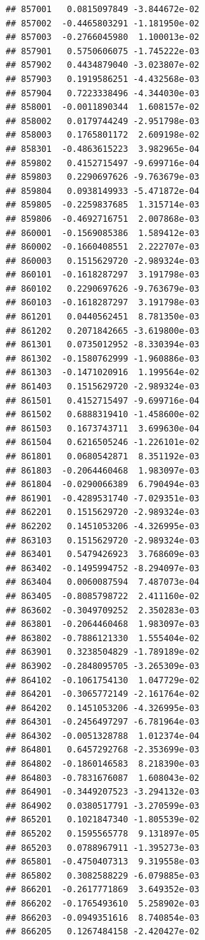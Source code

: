 \begin{frame}[fragile]
\begin{verbatim}
## 857001   0.0815097849 -3.844672e-02
## 857002  -0.4465803291 -1.181950e-02
## 857003  -0.2766045980  1.100013e-02
## 857901   0.5750606075 -1.745222e-03
## 857902   0.4434879040 -3.023807e-02
## 857903   0.1919586251 -4.432568e-03
## 857904   0.7223338496 -4.344030e-03
## 858001  -0.0011890344  1.608157e-02
## 858002   0.0179744249 -2.951798e-03
## 858003   0.1765801172  2.609198e-02
## 858301  -0.4863615223  3.982965e-04
## 859802   0.4152715497 -9.699716e-04
## 859803   0.2290697626 -9.763679e-03
## 859804   0.0938149933 -5.471872e-04
## 859805  -0.2259837685  1.315714e-03
## 859806  -0.4692716751  2.007868e-03
## 860001  -0.1569085386  1.589412e-03
## 860002  -0.1660408551  2.222707e-03
## 860003   0.1515629720 -2.989324e-03
## 860101  -0.1618287297  3.191798e-03
## 860102   0.2290697626 -9.763679e-03
## 860103  -0.1618287297  3.191798e-03
## 861201   0.0440562451  8.781350e-03
## 861202   0.2071842665 -3.619800e-03
## 861301   0.0735012952 -8.330394e-03
## 861302  -0.1580762999 -1.960886e-03
## 861303  -0.1471020916  1.199564e-02
## 861403   0.1515629720 -2.989324e-03
## 861501   0.4152715497 -9.699716e-04
## 861502   0.6888319410 -1.458600e-02
## 861503   0.1673743711  3.699630e-04
## 861504   0.6216505246 -1.226101e-02
## 861801   0.0680542871  8.351192e-03
## 861803  -0.2064460468  1.983097e-03
## 861804  -0.0290066389  6.790494e-03
## 861901  -0.4289531740 -7.029351e-03
## 862201   0.1515629720 -2.989324e-03
## 862202   0.1451053206 -4.326995e-03
## 863103   0.1515629720 -2.989324e-03
## 863401   0.5479426923  3.768609e-03
## 863402  -0.1495994752 -8.294097e-03
## 863404   0.0060087594  7.487073e-04
## 863405  -0.8085798722  2.411160e-02
## 863602  -0.3049709252  2.350283e-03
## 863801  -0.2064460468  1.983097e-03
## 863802  -0.7886121330  1.555404e-02
## 863901   0.3238504829 -1.789189e-02
## 863902  -0.2848095705 -3.265309e-03
## 864102  -0.1061754130  1.047729e-02
## 864201  -0.3065772149 -2.161764e-02
## 864202   0.1451053206 -4.326995e-03
## 864301  -0.2456497297 -6.781964e-03
## 864302  -0.0051328788  1.012374e-04
## 864801   0.6457292768 -2.353699e-03
## 864802  -0.1860146583  8.218390e-03
## 864803  -0.7831676087  1.608043e-02
## 864901  -0.3449207523 -3.294132e-03
## 864902   0.0380517791 -3.270599e-03
## 865201   0.1021847340 -1.805539e-02
## 865202   0.1595565778  9.131897e-05
## 865203   0.0788967911 -1.395273e-03
## 865801  -0.4750407313  9.319558e-03
## 865802   0.3082588229 -6.079885e-03
## 866201  -0.2617771869  3.649352e-03
## 866202  -0.1765493610  5.258902e-03
## 866203  -0.0949351616  8.740854e-03
## 866205   0.1267484158 -2.420427e-02

\end{verbatim}
\end{frame}
